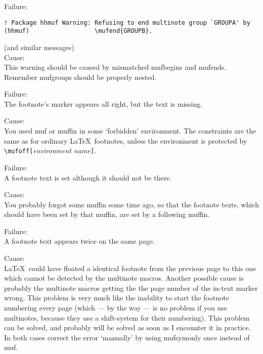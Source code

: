 \documentclass[11pt]{article}
\makeatletter
\def\macroname#1{{\ttfamily\@ttbs#1}}  %
\def\={\verb=}
\def\<#1>{\macroname{#1}}
\def\:{\linebreak[1]}
\makeatother
\begin{document}
Failure:
\begin{verbatim}
! Package hhmuf Warning: Refusing to end multinote group `GROUPA' by
(hhmuf)                  \mufend{GROUPB}.
\end{verbatim}
(and similar messages)\\
Cause:\\
This warning should be caused by mismatched \<mufbegin>s and \<mufend>s.
Remember mufgroups should be properly nested.

Failure:\\
The footnote's marker appears all right, but the text is missing.

Cause:\\
You used \<muf> or \<muffin> in some `forbidden' environment. The
constraints are the same as for ordinary \LaTeX\ footnotes, unless
the environment is protected by \=\mufoff=\:\=[=\textit{environment name}\=]=.

Failure:\\
A footnote text is set although it should not be there.

Cause:\\
You probably forgot some \<muffin> some time ago, so that the footnote
texts, which should have been set by that \<muffin>, are set by a following
\<muffin>.

Failure:\\
A footnote text appears twice on the same page.

Cause:\\
\LaTeX\ could have floated a identical footnote from the previous page to
this one which cannot be detected by the multinote macros.
Another possible cause is probably the multinote macros getting the
the page number of the in-text marker wrong. This problem is very
much like the inability to start the footnote numbering every page
(which --- by the way --- is no problem if you use multinotes, because
they use a shift-system for their numbering). This problem can be
solved, and probably will be solved as soon as I encounter it in
practice.
In both cases correct the error `manually' by using \<mufsymonly> once
instead of \<muf>.
\end{document}
